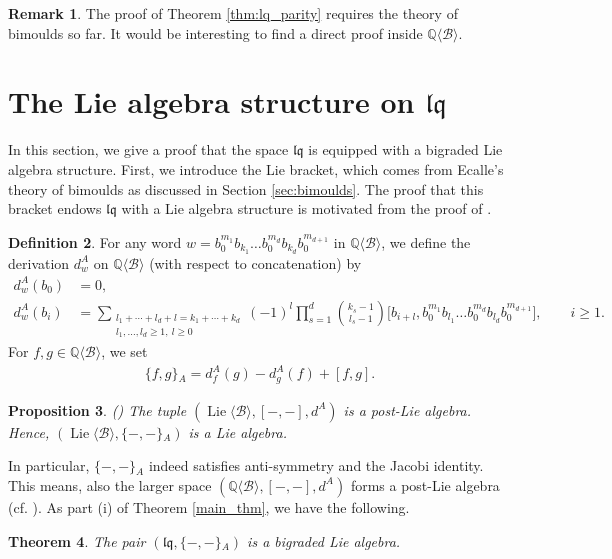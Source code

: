 \documentclass[12pt,reqno]{amsart}
\newtheorem{thm}{Theorem}[section]
\newtheorem{prop}[thm]{Proposition}
\numberwithin{equation}{section}
\theoremstyle{definition}
\newtheorem{defi}[thm]{Definition}
\newtheorem{rem}[thm]{Remark}
\newcommand{\QQ}{\mathbb{Q}}
\newcommand{\B}{\mathcal{B}}
\newcommand{\QB}{\QQ\langle \B\rangle}
\newcommand{\LieB}{\operatorname{Lie}\langle \B\rangle}
\newcommand{\lqq}{\mathfrak{lq}}
\newcommand{\ariemp}{\{-,-\}\!_A}
\newcommand{\ari}[2]{\{#1,#2\}\!_A}
\newcommand{\der}[1]{d_{#1}^A}
\begin{document}
\begin{rem} The proof of Theorem \ref{thm:lq_parity} requires the theory of bimoulds so far. It would be interesting to find a direct proof inside $\QB$.
\end{rem}

\section{The Lie algebra structure on $\lqq$} \label{sec:lq_Lie_alg}

In this section, we give a proof that the space $\lqq$ is equipped with a bigraded Lie algebra structure. First, we introduce the Lie bracket, which comes from Ecalle's theory of bimoulds as discussed in Section \ref{sec:bimoulds}. The proof that this bracket endows $\lqq$ with a Lie algebra structure is motivated from the proof of \cite[Theorem 2.5.6]{Sc15}.

\begin{defi} \label{def:Lie_bracket_lq}
For any word $w=b_0^{m_1}b_{k_1}\dots b_0^{m_d}b_{k_d}b_0^{m_{d+1}}$ in $\QB$, we define the derivation $\der{w}$ on $\QB$ (with respect to concatenation) by 
\begin{align*}
\der{w}(b_0)&=0, \\
\der{w}(b_i)&=\sum_{\substack{l_1+\cdots+l_d+l=k_1+\cdots+k_d\\ l_1,\ldots,l_d\geq1,\ l\geq0}}(-1)^l\prod_{s=1}^d \binom{k_s-1}{l_s-1} \big[b_{i+l},b_0^{m_1}b_{l_1}\dots b_0^{m_d}b_{l_d}b_0^{m_{d+1}}\big], \qquad i\geq1.
\end{align*}
For $f,g\in\QB$, we set 
\begin{align} \label{eq:def_liebracket_lq}
\ari{f}{g}=\der{f}(g)-\der{g}(f)+[f,g].
\end{align}
\end{defi}

\begin{prop} \label{prop:ari_post_lie}
(\cite[Theorem 4.13]{BK25}) The tuple $(\LieB,[-,-],\der{})$ is a post-Lie algebra. Hence, $(\LieB,\ariemp)$ is a Lie algebra.
\end{prop} 

In particular, $\ariemp$ indeed satisfies anti-symmetry and the Jacobi identity. This means, also the larger space $(\QB,[-,-],\der{})$ forms a post-Lie algebra (cf.  \cite[Key Lemma 3.18]{Bu23}). As part (i) of Theorem \ref{main_thm}, we have the following.

\begin{thm} \label{thm:lqq_Lie_alg} The pair $(\lqq,\ariemp)$ is a bigraded Lie algebra.
\end{thm}
\end{document}
